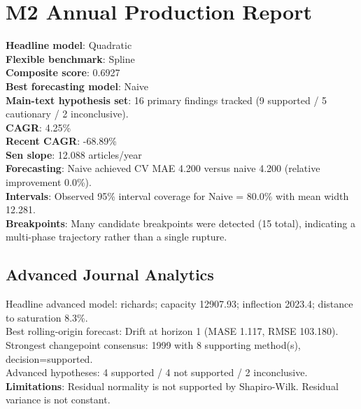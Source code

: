 \section*{M2 Annual Production Report}
\textbf{Headline model}: Quadratic\\
\textbf{Flexible benchmark}: Spline\\
\textbf{Composite score}: 0.6927\\
\textbf{Best forecasting model}: Naive\\
\textbf{Main-text hypothesis set}: 16 primary findings tracked (9 supported / 5 cautionary / 2 inconclusive).\\
\textbf{CAGR}: 4.25\%\\
\textbf{Recent CAGR}: -68.89\%\\
\textbf{Sen slope}: 12.088 articles/year\\
\textbf{Forecasting}: Naive achieved CV MAE 4.200 versus naive 4.200 (relative improvement 0.0\%).\\
\textbf{Intervals}: Observed 95\% interval coverage for Naive = 80.0\% with mean width 12.281.\\
\textbf{Breakpoints}: Many candidate breakpoints were detected (15 total), indicating a multi-phase trajectory rather than a single rupture.\\
\subsection*{Advanced Journal Analytics}
  Headline advanced model: richards; capacity 12907.93; inflection 2023.4; distance to saturation 8.3\%.\\  Best rolling-origin forecast: Drift at horizon 1 (MASE 1.117, RMSE 103.180).\\  Strongest changepoint consensus: 1999 with 8 supporting method(s), decision=supported.\\  Advanced hypotheses: 4 supported / 4 not supported / 2 inconclusive.
\textbf{Limitations}: Residual normality is not supported by Shapiro-Wilk. Residual variance is not constant.\\
